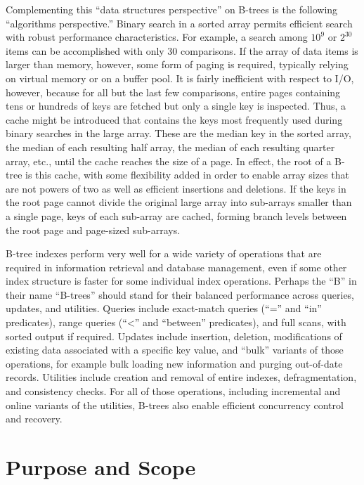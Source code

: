 Complementing this ``data structures perspective'' on B-trees is the
following ``algorithms perspective.'' Binary search in a sorted array
permits efficient search with robust performance characteristics. For
example, a search among $10^9$ or $2^30$
items can be accomplished with only $30$ comparisons. If the array of data
items is larger than memory, however, some form of paging is required,
typically relying on virtual memory or on a buffer pool. It is fairly
inefficient with respect to I/O, however, because for all but the last
few comparisons, entire pages containing tens or hundreds of keys are
fetched but only a single key is inspected. Thus, a cache might be
introduced that contains the keys most frequently used during binary
searches in the large array. These are the median key in the sorted
array, the median of each resulting half array, the median of each
resulting quarter array, etc., until the cache reaches the size of a
page. In effect, the root of a B-tree is this cache, with some
flexibility added in order to enable array sizes that are not powers of
two as well as efficient insertions and deletions. If the keys in the
root page cannot divide the original large array into sub-arrays smaller
than a single page, keys of each sub-array are cached, forming branch
levels between the root page and page-sized sub-arrays.

B-tree indexes perform very well for a wide variety of operations that
are required in information retrieval and database management, even if
some other index structure is faster for some individual index
operations. Perhaps the ``B'' in their name ``B-trees'' should stand for
their balanced performance across queries, updates, and utilities.
Queries include exact-match queries (``='' and ``in'' predicates), range
queries (``\textless{}'' and ``between'' predicates), and full
scans, with sorted output if required. Updates include insertion,
deletion, modifications of existing data associated with a specific key
value, and ``bulk'' variants of those operations, for example bulk
loading new information and purging out-of-date records. Utilities
include creation and removal of entire indexes, defragmentation, and
consistency checks. For all of those operations, including incremental
and online variants of the utilities, B-trees also enable efficient
concurrency control and recovery.

\hypertarget{purpose-and-scope}{%
\section{Purpose and Scope}\label{purpose-and-scope}}

